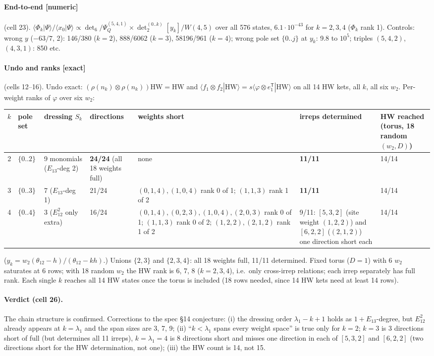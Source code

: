 \documentclass[11pt]{article}
\newcommand{\eT}{e_1^{\mathsf T}}
\newcommand{\thh}{\theta_{12}}
\newcommand{\ex}{\textbf{[exact]}}
\newcommand{\nm}{\textbf{[numeric]}}
\begin{document}
\paragraph{End-to-end \nm} (cell 23). $\langle\Phi_k|\Psi\rangle/\langle x_0|\Psi\rangle\propto\det_6/\Psi_Q^{(5,4,1)}\times\det_2^{(0..k)}[y_k]/W(4,5)$ over all 576 states, $6.1\cdot10^{-43}$ for $k=2,3,4$ ($\Phi_k$ rank 1). Controls: wrong $y$ ($-63/7$, 2): 146/380 ($k=2$), 888/6062 ($k=3$), 58196/961 ($k=4$); wrong pole set $\{0..j\}$ at $y_k$: 9.8 to $10^5$; triples $(5,4,2)$, $(4,3,1)$: 850 etc.

\paragraph{Undo and ranks \ex} (cells 12--16). Undo exact: $(\rho(n_k)\otimes\rho(n_k))\mathrm{HW}=\mathrm{HW}$ and $\langle f_1\otimes f_2|\mathrm{HW}\rangle=s\langle\varphi\otimes\eT|\mathrm{HW}\rangle$ on all 14 HW kets, all $k$, all six $w_2$. Per-weight ranks of $\varphi$ over six $w_2$:
\begin{center}\small
\begin{tabular}{@{}cllllp{3.7cm}p{3.2cm}@{}}\toprule
$k$ & pole set & dressing $S_k$ & directions & weights short & irreps determined & HW reached (torus, 18 random $(w_2,D)$)\\\midrule
2 & $\{0..2\}$ & 9 monomials ($E_{13}$-deg 2) & \textbf{24/24} (all 18 weights full) & none & \textbf{11/11} & 14/14\\
3 & $\{0..3\}$ & 7 ($E_{13}$-deg 1) & 21/24 & $(0,1,4),(1,0,4)$ rank 0 of 1; $(1,1,3)$ rank 1 of 2 & \textbf{11/11} & 14/14\\
4 & $\{0..4\}$ & 3 ($E_{12}^2$ only extra) & 16/24 & $(0,1,4),(0,2,3),(1,0,4),(2,0,3)$ rank 0 of 1; $(1,1,3)$ rank 0 of 2; $(1,2,2),(2,1,2)$ rank 1 of 2 & 9/11: $[5,3,2]$ (site weight $(1,2,2)$) and $[6,2,2]$ ($(2,1,2)$) one direction short each & 14/14\\\bottomrule
\end{tabular}
\end{center}
($y_k=w_2(\thh-h)/(\thh-kh)$.) Unions $\{2,3\}$ and $\{2,3,4\}$: all 18 weights full, 11/11 determined. Fixed torus ($D=1$) with 6 $w_2$ saturates at 6 rows; with 18 random $w_2$ the HW rank is 6, 7, 8 ($k=2,3,4$), i.e.\ only cross-irrep relations; each irrep separately has full rank. Each single $k$ reaches all 14 HW states once the torus is included (18 rows needed, since 14 HW kets need at least 14 rows).

\paragraph{Verdict (cell 26).} The chain structure is confirmed. Corrections to the spec \S14 conjecture: (i) the dressing order $\lambda_1-k+1$ holds as $1+E_{13}$-degree, but $E_{12}^2$ already appears at $k=\lambda_1$ and the span sizes are 3, 7, 9; (ii) ``$k<\lambda_1$ spans every weight space'' is true only for $k=2$; $k=3$ is 3 directions short of full (but determines all 11 irreps), $k=\lambda_1=4$ is 8 directions short and misses one direction in each of $[5,3,2]$ and $[6,2,2]$ (two directions short for the HW determination, not one); (iii) the HW count is 14, not 15.
\end{document}

